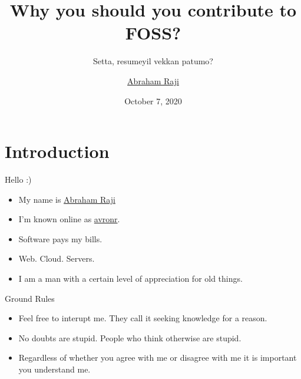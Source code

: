 \documentclass[presentation]{beamer}
\author{\href{mailto:avronr@tuta.io}{Abraham Raji}}
\date{October 7, 2020}
\title{Why you should you contribute to FOSS?}
\subtitle{Setta, resumeyil vekkan patumo?}}
\begin{document}
\maketitle
\section*{Introduction}
\label{sec:orge6836e0}
\begin{frame}[label={sec:org7b9294c}]{Hello :)}
\begin{itemize}
\item My name is \href{https://abrahamraji.in}{Abraham Raji}
\item I'm known online as \href{mailto:avronr@tuta.io}{avronr}.
\item Software pays my bills.
\item Web. Cloud. Servers.
\item I am a man with a certain level of appreciation for old things.
\end{itemize}
\begin{block}{Ground Rules}
\begin{itemize}
\item Feel free to interupt me.
They call it seeking knowledge for a reason.
\item No doubts are stupid. People who think otherwise are stupid.
\item Regardless of whether you agree with me or disagree with me it is important
you understand me.
\end{itemize}
\end{block}
\end{frame}
\end{document}
